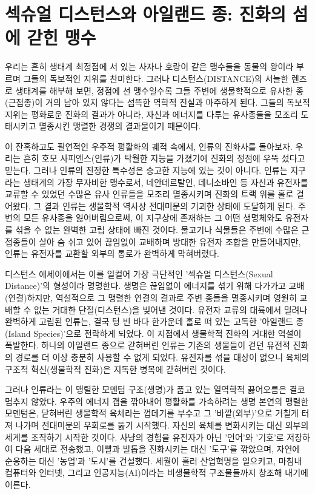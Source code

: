 

\section{섹슈얼 디스턴스와 아일랜드 종: 진화의 섬에 갇힌 맹수}
우리는 흔히 생태계 최정점에 서 있는 사자나 호랑이 같은 맹수들을 동물의 왕이라 부르며 그들의 독보적인 지위를 찬미한다. 그러나 디스턴스(DISTANCE)의 서늘한 렌즈로 생태계를 해부해 보면, 정점에 선 맹수일수록 그들 주변에 생물학적으로 유사한 종(근접종)이 거의 남아 있지 않다는 섬뜩한 역학적 진실과 마주하게 된다. 그들의 독보적 지위는 평화로운 진화의 결과가 아니라, 자신과 에너지를 다투는 유사종들을 모조리 도태시키고 멸종시킨 맹렬한 경쟁의 결과물이기 때문이다.

이 잔혹하고도 필연적인 우주적 평활화의 궤적 속에서, 인류의 진화사를 돌아보자. 우리는 흔히 호모 사피엔스(인류)가 탁월한 지능을 가졌기에 진화의 정점에 우뚝 섰다고 믿는다. 그러나 인류의 진정한 특수성은 숭고한 지능에 있는 것이 아니다. 인류는 지구라는 생태계의 가장 무자비한 맹수로서, 네안데르탈인, 데니소바인 등 자신과 유전자를 교류할 수 있었던 수많은 유사 인류들을 모조리 멸종시키며 진화의 트랙 위를 홀로 걸어왔다.
그 결과 인류는 생물학적 역사상 전대미문의 기괴한 상태에 도달하게 된다. 주변의 모든 유사종을 잃어버림으로써, 이 지구상에 존재하는 그 어떤 생명체와도 유전자를 섞을 수 없는 완벽한 고립 상태에 빠진 것이다. 물고기나 식물들은 주변에 수많은 근접종들이 살아 숨 쉬고 있어 끊임없이 교배하며 방대한 유전자 조합을 만들어내지만, 인류는 유전자를 교환할 외부의 통로가 완벽하게 막혀버렸다.

디스턴스 에세이에서는 이를 일컬어 가장 극단적인 '섹슈얼 디스턴스(Sexual Distance)'의 형성이라 명명한다. 생명은 끊임없이 에너지를 섞기 위해 다가가고 교배(연결)하지만, 역설적으로 그 맹렬한 연결의 결과로 주변 종들을 멸종시키며 영원히 교배할 수 없는 거대한 단절(디스턴스)을 빚어낸 것이다. 유전자 교류의 대륙에서 밀려나 완벽하게 고립된 인류는, 결국 텅 빈 바다 한가운데 홀로 떠 있는 고독한 '아일랜드 종(Island Species)'으로 전락하게 되었다.
이 지점에서 생물학적 진화의 거대한 역설이 폭발한다. 하나의 아일랜드 종으로 갇혀버린 인류는 기존의 생물들이 걷던 유전적 진화의 경로를 더 이상 충분히 사용할 수 없게 되었다. 유전자를 섞을 대상이 없으니 육체의 구조적 혁신(생물학적 진화)은 지독한 병목에 갇혀버린 것이다.

그러나 인류라는 이 맹렬한 모멘텀 구조(생명)가 품고 있는 열역학적 끓어오름은 결코 멈추지 않았다. 우주의 에너지 갭을 깎아내어 평활화를 가속하려는 생명 본연의 맹렬한 모멘텀은, 닫혀버린 생물학적 육체라는 껍데기를 부수고 그 '바깥(외부)'으로 거칠게 터져 나가며 전대미문의 우회로를 뚫기 시작했다.
자신의 육체를 변화시키는 대신 외부의 세계를 조작하기 시작한 것이다. 사냥의 경험을 유전자가 아닌 '언어'와 '기호'로 저장하여 다음 세대로 전송했고, 이빨과 발톱을 진화시키는 대신 '도구'를 깎았으며, 자연에 순응하는 대신 '농업'과 '도시'를 건설했다. 세월이 흘러 산업혁명을 일으키고, 마침내 컴퓨터와 인터넷, 그리고 인공지능(AI)이라는 비생물학적 구조물들까지 창조해 내기에 이른다.

